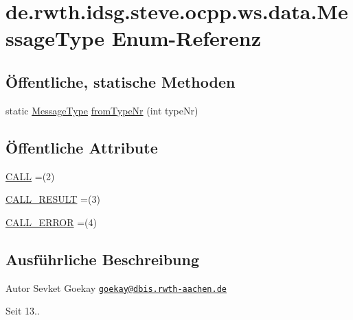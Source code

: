 \hypertarget{enumde_1_1rwth_1_1idsg_1_1steve_1_1ocpp_1_1ws_1_1data_1_1_message_type}{\section{de.\+rwth.\+idsg.\+steve.\+ocpp.\+ws.\+data.\+Message\+Type Enum-\/\+Referenz}
\label{enumde_1_1rwth_1_1idsg_1_1steve_1_1ocpp_1_1ws_1_1data_1_1_message_type}
}
\subsection*{Öffentliche, statische Methoden}
\begin{DoxyCompactItemize}
\item 
static \hyperlink{enumde_1_1rwth_1_1idsg_1_1steve_1_1ocpp_1_1ws_1_1data_1_1_message_type}{Message\+Type} \hyperlink{enumde_1_1rwth_1_1idsg_1_1steve_1_1ocpp_1_1ws_1_1data_1_1_message_type_a4fa62c1551fc82b3a389119a6f2cc000}{from\+Type\+Nr} (int type\+Nr)
\end{DoxyCompactItemize}
\subsection*{Öffentliche Attribute}
\begin{DoxyCompactItemize}
\item 
\hyperlink{enumde_1_1rwth_1_1idsg_1_1steve_1_1ocpp_1_1ws_1_1data_1_1_message_type_a8c9631be897fe932418c583d7aecf89e}{C\+A\+L\+L} =(2)
\item 
\hyperlink{enumde_1_1rwth_1_1idsg_1_1steve_1_1ocpp_1_1ws_1_1data_1_1_message_type_a4bc539499fbd752d76ede7c8768c4f38}{C\+A\+L\+L\+\_\+\+R\+E\+S\+U\+L\+T} =(3)
\item 
\hyperlink{enumde_1_1rwth_1_1idsg_1_1steve_1_1ocpp_1_1ws_1_1data_1_1_message_type_a9e7086380926a62f0316b519da21ccea}{C\+A\+L\+L\+\_\+\+E\+R\+R\+O\+R} =(4)
\end{DoxyCompactItemize}


\subsection{Ausführliche Beschreibung}
\begin{DoxyAuthor}{Autor}
Sevket Goekay \href{mailto:goekay@dbis.rwth-aachen.de}{\tt goekay@dbis.\+rwth-\/aachen.\+de} 
\end{DoxyAuthor}
\begin{DoxySince}{Seit}
13.. 
\end{DoxySince}


